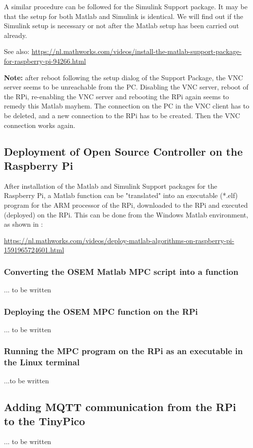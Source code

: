 A similar procedure can be followed for the Simulink Support package. It may be that the setup for both Matlab and Simulink is identical. We will find out if the Simulink setup is necessary or not after the Matlab setup has been carried out already.

See also: \cite{RPi_1, RPi_Connecting, RPi_Getting_Started} \url{https://nl.mathworks.com/videos/install-the-matlab-support-package-for-raspberry-pi-94266.html}

\textbf{Note:} after reboot following the setup dialog of the Support Package, the VNC server seems to be unreachable from the PC.
Disabling the VNC server, reboot of the RPi, re-enabling the VNC server and rebooting the RPi again seems to remedy this Matlab mayhem. The connection on the PC in the VNC client has to be deleted, and a new connection to the RPi has to be created. Then the VNC connection works again.

\subsection{Deployment of Open Source Controller on the Raspberry Pi}

After installation of the Matlab and Simulink Support packages for the Raspberry Pi, a Matlab function can be "translated" into an executable (*.elf) program for the ARM processor of the RPi, downloaded to the RPi and executed (deployed) on the RPi. This can be done from the Windows Matlab environment, as shown in \cite{RPi_2, RPi_Deploying, RPi_Target}:

\url{https://nl.mathworks.com/videos/deploy-matlab-algorithms-on-raspberry-pi-1591965724601.html}

\subsubsection{Converting the OSEM Matlab MPC script into a function}

... to be written

\subsubsection{Deploying the OSEM MPC function on the RPi}

... to be written

\subsubsection{Running the MPC program on the RPi as an executable in the Linux terminal}

...to be written

\subsection{Adding MQTT communication from the RPi to the TinyPico}

... to be written





